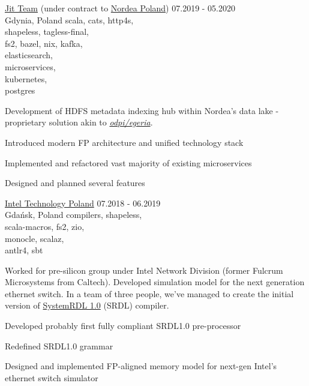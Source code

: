       {\href{https://www.jit.team}{Jit Team} (under contract to \href{https://www.nordea.com}{Nordea Poland})}
      {07.2019 - 05.2020\\Gdynia, Poland}
      {scala, cats, http4s,\\shapeless, tagless-final,\\fs2, bazel, nix, kafka,\\elasticsearch,\\microservices,\\kubernetes,\\postgres
      }
      {Development of HDFS metadata indexing hub within Nordea's data lake - proprietary solution akin to \href{https://egeria.odpi.org}{\emph{odpi/egeria}}.
        \begin{missions}
        \item Introduced modern FP architecture and unified technology stack
        \item Implemented and refactored vast majority of existing microservices
        \item Designed and planned several features
        \end{missions}
      }
      {\href{https://www.intel.com/content/www/us/en/jobs/locations/poland.html}{Intel Technology Poland}}
      {07.2018 - 06.2019\\Gdańsk, Poland}
      {compilers, shapeless,\\scala-macros, fs2, zio,\\monocle, scalaz,\\antlr4, sbt}
      {Worked for pre-silicon group under Intel Network Division (former Fulcrum Microsystems from Caltech).
        Developed simulation model for the next generation ethernet switch. In a team of three people, we've
        managed to create the initial version of
        \href{https://www.accellera.org/downloads/standards/systemrdl}{SystemRDL 1.0} (SRDL) compiler.
        \begin{missions}
        \item Developed probably first fully compliant SRDL1.0 pre-processor
        \item Redefined SRDL1.0 grammar
        \item Designed and implemented FP-aligned memory model for next-gen Intel's ethernet switch simulator
        \end{missions}
      }
